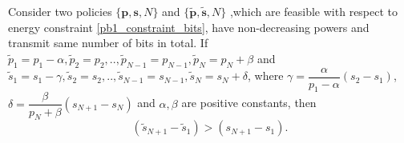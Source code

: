 \begin{lemma}
Consider two policies $\{\textbf{p},\textbf{s},N\}$  and $\{\bm{\widetilde{p}},\bm{\widetilde{s}},N\}$ ,which are feasible with respect to energy constraint \eqref{pb1_constraint_bits}, have non-decreasing powers and transmit same number of bits in total. If $\widetilde{p}_1=p_1-\alpha,\widetilde{p}_2=p_2,..,\widetilde{p}_{N-1}=p_{N-1},\widetilde{p}_N=p_N+\beta $ and $\widetilde{s}_1=s_1-\gamma,\widetilde{s}_2=s_2,..,\widetilde{s}_{N-1}=s_{N-1},\widetilde{s}_N=s_N+\delta $, where $\gamma=\dfrac{\alpha}{p_1-\alpha}(s_2-s_1)$, $\delta =\dfrac{\beta}{p_N+\beta}(s_{N+1}-s_N)$ and $\alpha ,\beta$ are positive constants, then 
\begin{equation}
(\widetilde{s}_{N+1}-\widetilde{s}_1)>(s_{N+1}-s_1).
\end{equation}
\label{lemma_increase_time}
\end{lemma}
